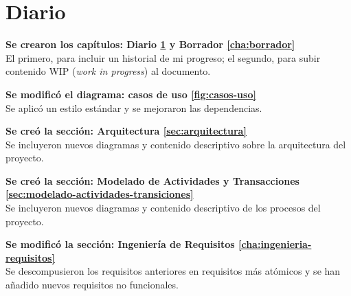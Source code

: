     
    
    
    
\chapter{Diario}
    \label{cha:diario}
    
    \textbf{Se crearon los capítulos: Diario \ref{cha:diario} y Borrador \ref{cha:borrador}}\\
    El primero, para incluir un historial de mi progreso; el segundo, para subir contenido WIP (\textit{work in progress}) al documento.
    
    \textbf{Se modificó el diagrama: casos de uso \ref{fig:casos-uso}}\\
    Se aplicó un estilo estándar y se mejoraron las dependencias.
    
    \textbf{Se creó la sección: Arquitectura \ref{sec:arquitectura}}\\
    Se incluyeron nuevos diagramas y contenido descriptivo sobre la arquitectura del proyecto.
    
    \textbf{Se creó la sección: Modelado de Actividades y Transacciones \ref{sec:modelado-actividades-transiciones}}\\
    Se incluyeron nuevos diagramas y contenido descriptivo de los procesos del proyecto.
    
    \textbf{Se modificó la sección: Ingeniería de Requisitos \ref{cha:ingenieria-requisitos}}\\
    Se descompusieron los requisitos anteriores en requisitos más atómicos y se han añadido nuevos requisitos no funcionales.
    